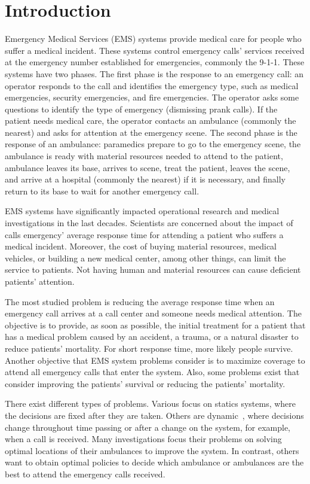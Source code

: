 \chapter{Introduction}

Emergency Medical Services (EMS) systems provide medical care for people who suffer a medical incident. These systems control emergency calls' services received at the emergency number established for emergencies, commonly the 9-1-1. These systems have two phases. The first phase is the response to an emergency call: an operator responds to the call and identifies the emergency type, such as medical emergencies, security emergencies, and fire emergencies. The operator asks some questions to identify the type of emergency (dismissing prank calls). If the patient needs medical care, the operator contacts an ambulance (commonly the nearest) and asks for attention at the emergency scene. The second phase is the response of an ambulance: paramedics prepare to go to the emergency scene, the ambulance is ready with material resources needed to attend to the patient, ambulance leaves its base, arrives to scene, treat the patient, leaves the scene, and arrive at a hospital (commonly the nearest) if it is necessary, and finally return to its base to wait for another emergency call.

EMS systems have significantly impacted operational research and medical investigations in the last decades. Scientists are concerned about the impact of calls emergency' average response time for attending a patient who suffers a medical incident. Moreover, the cost of buying material resources, medical vehicles, or building a new medical center, among other things, can limit the service to patients. Not having human and material resources can cause deficient patients' attention.

The most studied problem is reducing the average response time when an emergency call arrives at a call center and someone needs medical attention. 
The objective is to provide, as soon as possible, the initial treatment for a patient that has a medical problem caused by an accident, a trauma, or a natural disaster to reduce patients' mortality. For short response time, more likely people survive. Another objective that EMS system problems consider is to maximize coverage to attend all emergency calls that enter the system. Also, some problems exist that consider improving the patients' survival or reducing the patients' mortality. 

There exist different types of problems. Various focus on statics systems, where the decisions are fixed after they are taken. Others are dynamic~\cite{brotcorne2003ambulance}, where decisions change throughout time passing or after a change on the system, for example, when a call is received. Many investigations focus their problems on solving optimal locations of their ambulances to improve the system. In contrast, others want to obtain optimal policies to decide which ambulance or ambulances are the best to attend the emergency calls received.

